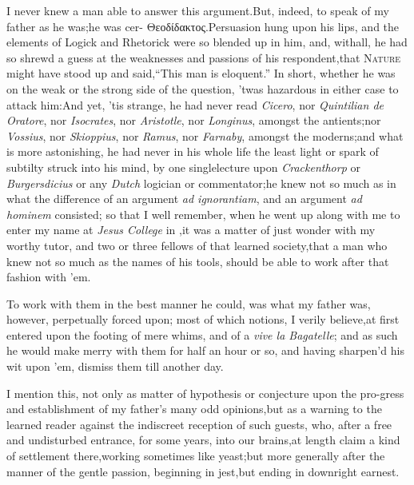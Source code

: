 \documentclass{article}
\begin{document}
I never knew a man able to answer this argument.\tsk  But, indeed, to speak of
my father as he was;\tsk  he was cer-\pb 
{}
{\small Θεοδίδακτο}ς.\tsk  Persuasion hung upon his lips, and the
elements of Logick and Rhetorick were so blended up in him,\tsk\break
and, withall,
he had so shrewd a guess at the weaknesses and passions of his
respondent,\tsh  that \textsc{Nature} might have stood up and
said,\tsk  “This man is eloquent.”  In short, whether he was
on the weak or the strong side of the question, ’twas hazardous in either
case to attack him:\tsk  And yet, ’tis strange, he had never read
\textit{Cicero}, nor \textit{Quintilian de Oratore}, nor \textit{Isocrates}, nor
\textit{Aristotle}, nor \textit{Longinus}, amongst the antients;\tsk  nor
\textit{Vossius}, nor \textit{Skioppius}, nor \textit{Ramus}, nor \textit{Farnaby},
amongst the moderns;\tsk  and what is more astonishing, he had never in his
whole life the least light or spark of subtilty struck into his mind, by one
single\pb lecture upon \textit{Crackenthorp} or \textit{Burgersdicius} or any
\textit{Dutch} logician or commentator;\tsk  he knew not so much as in what the
difference of an argument \textit{ad ignorantiam}, and an argument \textit{ad
hominem} consisted; so that I well remember, when he went up along with me
to enter my name at \textit{Jesus College} in \astiv,\tsk  it was a matter of just
wonder with my worthy tutor, and two or three fellows of that learned
society,\tsk  that a man who knew not so much as the names of his tools,
should be able to work after that fashion with ’em.

To work with them in the best manner he could, was what my
father was, however, perpetually forced upon;\tsh\break 
{}
most of which notions, I verily believe,\pb at
first entered upon the footing of mere whims, and of a \textit{vive la
Bagatelle}; and as such he would make merry with them for half
an hour or so, and having sharpen’d his wit upon ’em, dismiss them
till another day.

I mention this, not only as matter of hypothesis or conjecture
upon the pro-\break gress and establishment of my father’s many
odd opinions,\tsk  but as a warning to the learned reader against
the indiscreet reception of such guests, who, after a free and
undisturbed entrance, for some years, into our brains,\tsk  at
length claim a kind of settlement there,\tsh  working
sometimes like yeast;\tsk  but more generally after the manner of
the gentle passion, beginning in jest,\tsk  but ending in
downright earnest.
\end{document}
